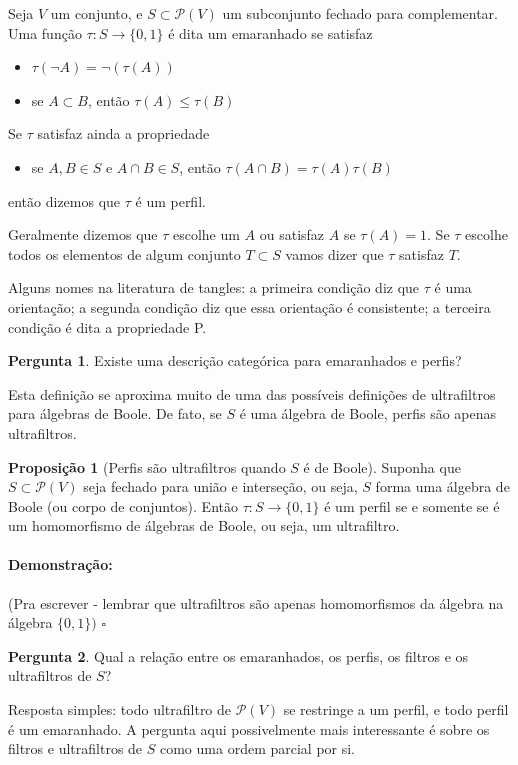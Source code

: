 \documentclass[11pt]{article}
\renewcommand{\textit}[1]{{\fakeitalic#1}}
\newcommand{\pulinho}{\vspace{.5cm}}
\theoremstyle{definition}
\theoremstyle{definition}
\theoremstyle{definition}
\newtheorem{prop}{Proposição}
\newenvironment{proposicao}{
\definecolor{shadecolor}{HTML}{FFDBDF}
\begin{shaded}
\begin{prop}
}
{
\end{prop}
\end{shaded}
}
\theoremstyle{definition}
\theoremstyle{definition}
\theoremstyle{definition}
\theoremstyle{definition}
\theoremstyle{definition}
\newtheorem*{definition*}{Definição}
\newenvironment{definicao*}{
\definecolor{shadecolor}{HTML}{defcfc}
\begin{shaded}
\begin{definition*}
}
{
\end{definition*}
\end{shaded}
}
\theoremstyle{definition}
\theoremstyle{definition}
\theoremstyle{definition}
\theoremstyle{definition}
\newenvironment{prova}{\paragraph{Demonstração:}}{\hfill$\square$ 
\pulinho
}
\theoremstyle{definition}
\theoremstyle{definition}
\newtheorem{preguta}{Pergunta}
\newenvironment{pergunta}{
\definecolor{shadecolor}{HTML}{FFF8F0}
\begin{shaded}
\begin{preguta}
}
{
\end{preguta}
\end{shaded}
}
\begin{document}
\begin{definicao*}Seja $V$ um conjunto, e $S \subset \mathcal{P}(V)$ um subconjunto fechado para complementar. Uma função $\tau: S \rightarrow \{0,1\}$ é dita um \textit{emaranhado} se satisfaz
  \begin{itemize}[label=]
  \item $\tau(\lnot A) = \lnot (\tau(A))$
  \item se $A \subset B$, então $\tau(A) \leq \tau(B)$
  \end{itemize}
Se $\tau$ satisfaz ainda a propriedade
\begin{itemize}[label=]
  \item se $A,B \in S$ e $A \cap B \in S$, então $\tau(A \cap B) = \tau(A)\tau(B)$
\end{itemize}
então dizemos que $\tau$ é um perfil.


Geralmente dizemos que $\tau$ escolhe um $A$ ou satisfaz $A$ se $\tau(A) = 1$. Se $\tau$ escolhe todos os elementos de algum conjunto $T \subset S$ vamos dizer que $\tau$ satisfaz $T$.

Alguns nomes na literatura de tangles: a primeira condição diz que $\tau$ é uma orientação; a segunda condição diz que essa orientação é consistente; a terceira condição é dita a propriedade P.
\end{definicao*}

\begin{pergunta}
  Existe uma descrição categórica para emaranhados e perfis?
\end{pergunta}

Esta definição se aproxima muito de uma das possíveis definições de ultrafiltros para álgebras de Boole. De fato, se $S$ é uma álgebra de Boole, perfis são apenas ultrafiltros.

\begin{proposicao}[Perfis são ultrafiltros quando $S$ é de Boole]
  Suponha que $S \subset \mathcal{P}(V)$ seja fechado para união e interseção, ou seja, $S$ forma uma álgebra de Boole (ou corpo de conjuntos). Então $\tau:S \rightarrow \{0,1\}$ é um perfil se e somente se é um homomorfismo de álgebras de Boole, ou seja, um ultrafiltro.
\end{proposicao}
\begin{prova}
 (Pra escrever - lembrar que ultrafiltros são apenas homomorfismos da álgebra na álgebra $\{0,1\})$
\end{prova}

\begin{pergunta}
  Qual a relação entre os emaranhados, os perfis, os filtros e os ultrafiltros de $S$?

  Resposta simples: todo ultrafiltro de $\mathcal{P}(V)$ se restringe a um perfil, e todo perfil é um emaranhado. A pergunta aqui possivelmente mais interessante é sobre os filtros e ultrafiltros de $S$ como uma ordem parcial por si.
\end{pergunta}
\end{document}

